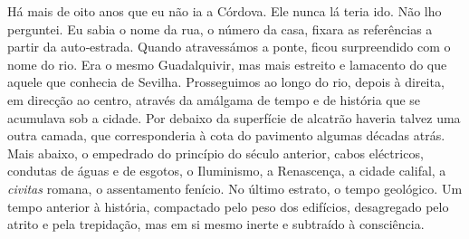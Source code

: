Há mais de oito anos que eu não ia a Córdova. Ele nunca lá teria ido.
Não lho perguntei. Eu sabia o nome da rua, o número da casa, fixara as
referências a partir da auto­‑estrada. Quando atravessámos a ponte,
ficou surpreendido com o nome do rio. Era o mesmo Guadalquivir, mas mais
estreito e lamacento do que aquele que conhecia de Sevilha. Prosseguimos
ao longo do rio, depois à direita, em direcção ao centro, através da
amálgama de tempo e de história que se acumulava sob a cidade. Por
debaixo da superfície de alcatrão haveria talvez uma outra camada, que
corresponderia à cota do pavimento algumas décadas atrás. Mais abaixo, o
empedrado do princípio do século anterior, cabos eléctricos, condutas de
águas e de esgotos, o Iluminismo, a Renascença, a cidade califal, a
\emph{civitas} romana, o assentamento fenício. No último estrato, o
tempo geológico. Um tempo anterior à história, compactado pelo peso dos
edifícios, desagregado pelo atrito e pela trepidação, mas em si mesmo
inerte e subtraído à consciência.


